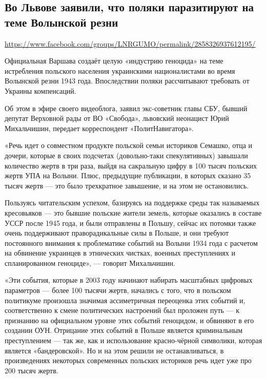  
 
  
\subsection{Во Львове заявили, что поляки паразитируют на теме Волынской резни}
\label{sec:19_07_2020.fb.lnr.13}
\url{https://www.facebook.com/groups/LNRGUMO/permalink/2858326937612195/}

Официальная Варшава создаёт целую «индустрию геноцида» на теме истребления
польского населения украинскими националистами во время Волынской резни 1943
года. Впоследствии поляки рассчитывают требовать от Украины компенсаций.

Об этом в эфире своего видеоблога, заявил экс-советник главы СБУ, бывший
депутат Верховной рады от ВО «Свобода», львовский неонацист Юрий Михальчишин,
передает корреспондент «ПолитНавигатора».

«Речь идет о совместном продукте польской семьи историков Семашко, отца и
дочери, которые в своих подсчетах (довольно-таки спекулятивных) завышали
количество жертв в три раза, выйдя на сакральную цифру в 100 тысяч польских
жертв УПА на Волыни. Плюс, предыдущие публикации, в которых сказано 35 тысяч
жертв --- это было трехкратное завышение, и на этом не остановились.

Пользуясь читательским успехом, базируясь на поддержке среды так называемых
кресовьяков --- это бывшие польские жители земель, которые оказались в составе
УССР после 1945 года, и были отправлены в Польшу, сейчас их потомки также очень
поддерживают праворадикальные силы в Польше, и они требуют постоянного внимания
к проблематике событий на Волыни 1934 года с расчетом на обвинение украинцев в
этнических чистках, военных преступлениях и спланированном геноциде», --- говорит
Михальчишин.

«Эти события, которые в 2003 году начинают набирать масштабных цифровых
параметров --- более 100 тысячи жертв, начались с того, что в польском политикуме
произошла значимая ассиметричная переоценка этих событий и, соответственно к
смене политических настроений был проложен путь --- к признанию на официальном
уровне этих событий геноцидом, и обвиняют в его создании ОУН. Отрицание этих
событий в Польше является криминальным преступлением --- так же, как и
использование красно-чёрной символики, которая является «бандеровской». Но и на
этом решили не останавливаться, в произведениях некоторых современных польских
историков речь идет уже про 200 тысяч жертв.

